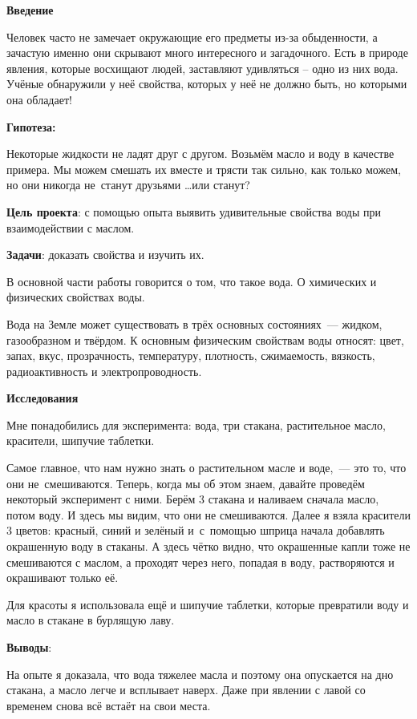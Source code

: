 


\makeProcTitleSchool



\textbf{Введение}

Человек часто не замечает окружающие его предметы из-за обыденности, а зачастую именно они скрывают много интересного и загадочного. Есть в природе явления, которые восхищают людей, заставляют удивляться – одно из них вода. Учёные обнаружили у неё свойства, которых у неё не должно быть, но которыми она обладает!

\textbf{Гипотеза:}

Некоторые жидкости не ладят друг с другом. Возьмём масло и воду в качестве примера. Мы можем смешать их вместе и трясти так сильно, как только можем, но они никогда не~станут друзьями \dots или станут?

\textbf{Цель проекта}: с помощью опыта выявить удивительные свойства воды при взаимодействии с маслом.

\textbf{Задачи}: доказать свойства и изучить их.

В основной части работы говорится о том, что такое вода. О химических и физических свойствах воды.

Вода на Земле может существовать в трёх основных состояниях~--- жидком, газообразном и твёрдом. К основным физическим свойствам воды относят: цвет, запах, вкус, прозрачность, температуру, плотность, сжимаемость, вязкость, радиоактивность и элект\-ропроводность.

\textbf{Исследования}

Мне понадобились для эксперимента: вода, три стакана, растительное масло, красители, шипучие таблетки.\enlargethispage{\baselineskip}

Самое главное, что нам нужно знать о растительном масле и воде,~--- это то, что они не~смешиваются. Теперь, когда мы об этом знаем, давайте проведём некоторый эксперимент с ними. Берём 3 стакана и наливаем сначала масло, потом воду.	И здесь мы видим, что они не смешиваются. Далее я взяла красители 3 цветов: красный, синий и зелёный и~с~помощью шприца начала добавлять окрашенную воду в стаканы. А здесь чётко видно, что окрашенные капли тоже не смешиваются с маслом, а проходят через него,  попадая в воду, растворяются и окрашивают только её.\enlargethispage{\baselineskip}

Для красоты я использовала ещё и шипучие таблетки, которые превратили воду и масло в стакане в бурлящую лаву.

\textbf{Выводы}:

На опыте я доказала, что вода тяжелее масла и поэтому она опускается на дно стакана, а масло легче и всплывает наверх. Даже при явлении с лавой со временем  снова всё встаёт на свои места.
